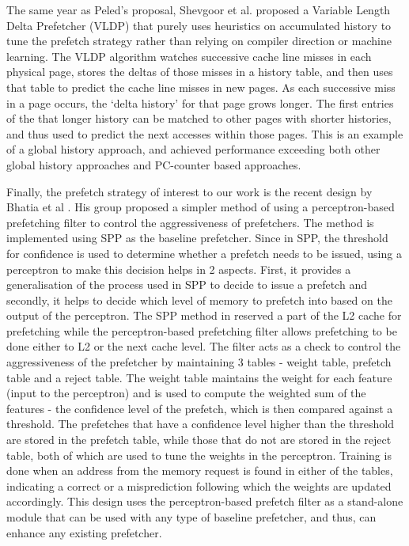 \documentclass[10pt,conference]{IEEEtran}
\begin{document}
The same year as Peled's proposal, Shevgoor et al. proposed a Variable Length Delta Prefetcher (VLDP) \cite{VLDP} that purely uses heuristics on accumulated history to tune the prefetch strategy rather than relying on compiler direction or machine learning. The VLDP algorithm watches successive cache line misses in each physical page, stores the deltas of those misses in a history table, and then uses that table to predict the cache line misses in new pages. As each successive miss in a page occurs, the `delta history' for that page grows longer. The first entries of the that longer history can be matched to other pages with shorter histories, and thus used to predict the next accesses within those pages. This is an example of a global history approach, and achieved performance exceeding both other global history approaches and PC-counter based approaches.

Finally, the prefetch strategy of interest to our work is the recent design by Bhatia et al \cite{ppf}. His group proposed a simpler method of using a perceptron-based prefetching filter to control the aggressiveness of prefetchers. The method is implemented using SPP\cite{SPP} as the baseline prefetcher. Since in SPP, the threshold for confidence is used to determine whether a prefetch needs to be issued, using a perceptron to make this decision helps in 2 aspects. First, it provides a generalisation of the process used in SPP to decide to issue a prefetch and secondly, it helps to decide which level of memory to prefetch into based on the output of the perceptron. The SPP method in \cite{SPP} reserved a part of the L2 cache for prefetching while the perceptron-based prefetching filter allows prefetching to be done either to L2 or the next cache level. The filter acts as a check to control the aggressiveness of the prefetcher by maintaining 3 tables - weight table, prefetch table and a reject table. The weight table maintains the weight for each feature (input to the perceptron) and is used to compute the weighted sum of the features - the confidence level of the prefetch, which is then compared against a threshold. The prefetches that have a confidence level higher than the threshold are stored in the prefetch table, while those that do not are stored in the reject table, both of which are used to tune the weights in the perceptron. Training is done when an address from the memory request is found in either of the tables, indicating a correct or a misprediction following which the weights are updated accordingly. This design uses the perceptron-based prefetch filter as a stand-alone module that can be used with any type of baseline prefetcher, and thus, can enhance any existing prefetcher. 
\end{document}
